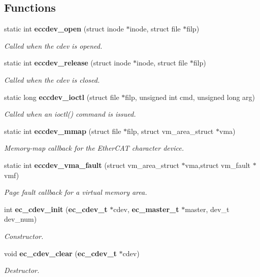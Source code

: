 \subsection*{\-Functions}
\begin{DoxyCompactItemize}
\item 
static int {\bf eccdev\-\_\-open} (struct inode $\ast$inode, struct file $\ast$filp)\label{cdev_8c_ac12a62dff23c807f50608bb1c3b99a69}

\begin{DoxyCompactList}\small\item\em \-Called when the cdev is opened. \end{DoxyCompactList}\item 
static int {\bf eccdev\-\_\-release} (struct inode $\ast$inode, struct file $\ast$filp)\label{cdev_8c_a0676fd59dff0432b9f378923d290129e}

\begin{DoxyCompactList}\small\item\em \-Called when the cdev is closed. \end{DoxyCompactList}\item 
static long {\bf eccdev\-\_\-ioctl} (struct file $\ast$filp, unsigned int cmd, unsigned long arg)\label{cdev_8c_abbf50f74e0ed9ba2d8db5b1f9184a49b}

\begin{DoxyCompactList}\small\item\em \-Called when an ioctl() command is issued. \end{DoxyCompactList}\item 
static int {\bf eccdev\-\_\-mmap} (struct file $\ast$filp, struct vm\-\_\-area\-\_\-struct $\ast$vma)
\begin{DoxyCompactList}\small\item\em \-Memory-\/map callback for the \-Ether\-C\-A\-T character device. \end{DoxyCompactList}\item 
static int {\bf eccdev\-\_\-vma\-\_\-fault} (struct vm\-\_\-area\-\_\-struct $\ast$vma,struct vm\-\_\-fault $\ast$vmf)
\begin{DoxyCompactList}\small\item\em \-Page fault callback for a virtual memory area. \end{DoxyCompactList}\item 
int {\bf ec\-\_\-cdev\-\_\-init} ({\bf ec\-\_\-cdev\-\_\-t} $\ast$cdev, {\bf ec\-\_\-master\-\_\-t} $\ast$master, dev\-\_\-t dev\-\_\-num)
\begin{DoxyCompactList}\small\item\em \-Constructor. \end{DoxyCompactList}\item 
void {\bf ec\-\_\-cdev\-\_\-clear} ({\bf ec\-\_\-cdev\-\_\-t} $\ast$cdev)
\begin{DoxyCompactList}\small\item\em \-Destructor. \end{DoxyCompactList}\end{DoxyCompactItemize}
